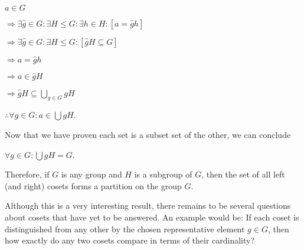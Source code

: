 \documentclass[12pt, a4paper]{article}
\begin{document}
\hspace{2mm} $a\in G$\par
\vspace{2mm}
\hspace{10mm} $\Rightarrow\exists \hat{g}\in G\colon\exists H\leqslant G\colon\exists h\in H\colon[a=\hat{g}h]$\par
\vspace{2mm}
\hspace{10mm} $\Rightarrow\exists \hat{g}\in G\colon\exists H\leqslant G\colon[\hat{g}H\subseteq G]$\par
\vspace{2mm}
\hspace{10mm} $\Rightarrow a=\hat{g}h$\par
\vspace{2mm}
\hspace{10mm} $\Rightarrow a\in\hat{g}H$\par
\vspace{2mm}
\hspace{10mm} $\Rightarrow\hat{g}H\subseteq$\large{$\bigcup\limits_{g\in G}$}\normalsize$gH$\par
\vspace{2mm}
\hspace{2mm} $\therefore \forall g\in G\colon a\in$\large{$\bigcup$}\normalsize$gH$.\par

\vspace{4mm}

    Now that we have proven each set is a subset set of the other, we can conclude\par
    
\vspace{4mm}

        \centerline{$\forall g\in G\colon$\large{$\bigcup$}\normalsize$gH=G$.}
        
\vspace{4mm}

    Therefore, if $G$ is any group and $H$ is a subgroup of $G$, then the set of all left (and right) cosets forms a partition on the group $G$.\par
    
    Although this is a very interesting result, there remains to be several questions about cosets that have yet to be answered. An example would be: If each coset is distinguished from any other by the chosen representative element $g\in G$, then how exactly do any two cosets compare in terms of their cardinality?\par
    
\end{document}
